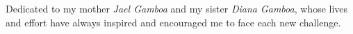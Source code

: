 
\thispagestyle{empty}


\vspace*{3cm}

\medskip

\begin{center}
Dedicated to my mother \emph{Jael Gamboa} and my sister \emph{Diana Gamboa}, whose lives and effort have always inspired and encouraged me to face each new challenge. \\ \smallskip
\myTime
\end{center}